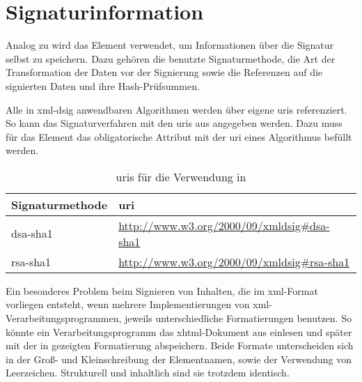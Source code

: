 \section{Signaturinformation}
Analog zu  wird das Element  verwendet, um Informationen über die Signatur selbst zu speichern. Dazu gehören die benutzte
Signaturmethode, die Art der Transformation der Daten vor der Signierung sowie die Referenzen auf die signierten Daten und ihre Hash-Prüfsummen.

Alle in \gls{xml-dsig} anwendbaren Algorithmen werden über eigene \glspl{uri} referenziert. So kann das Signaturverfahren mit den \glspl{uri} aus
 angegeben werden. Dazu muss für das Element  das obligatorische Attribut
 mit der \gls{uri} eines Algorithmus befüllt werden.

\begin{table}
    \centering
    \begin{tabularx}{\textwidth}{ l X }
        Signaturmethode & \gls{uri} \\
        \hline
        \hline
        \gls{dsa}-\gls{sha1} & \url{http://www.w3.org/2000/09/xmldsig\#dsa-sha1} \\
        \hline
        \gls{rsa}-\gls{sha1} & \url{http://www.w3.org/2000/09/xmldsig\#rsa-sha1} \\
        \hline
    \end{tabularx}
    \caption{\protect\glspl{uri} für die Verwendung in }
    \label{tab:xml-dsig-signature-method-uri}
\end{table}





Ein besonderes Problem beim Signieren von Inhalten, die im \gls{xml}-Format vorliegen entsteht, wenn mehrere Implementierungen von
\gls{xml}-Verarbeitungsprogrammen, jeweils unterschiedliche Formatierungen benutzen. So könnte ein Verarbeitungsprogramm das \gls{xhtml}-Dokument aus
 einlesen und später mit der in  gezeigten Formatierung abspeichern. Beide Formate unterscheiden sich
in der Groß- und Kleinschreibung der Elementnamen, sowie der Verwendung von Leerzeichen. Strukturell und inhaltlich sind sie trotzdem identisch.

